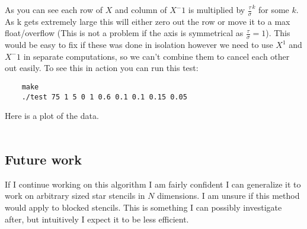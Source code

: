 \documentclass{article}
\begin{document}
As you can see each row of $X$ and column of $X^-1$ is multiplied by $\frac{\tau}{\sigma}^k$ for some $k$. 
As k gets extremely large this will either zero out the row or move it to a max float/overflow (This is not a problem if the axis is symmetrical as $\frac{\tau}{\sigma} = 1$).
This would be easy to fix if these was done in isolation however we need to use $X^1$ and $X^-1$ in separate computations, so we can't combine them to cancel each other out easily. 
To see this in action you can run this test: 
\begin{lstlisting}
	make
	./test 75 1 5 0 1 0.6 0.1 0.1 0.15 0.05
\end{lstlisting}
Here is a plot of the data. \\ \\
\subsection*{Future work}
If I continue working on this algorithm I am fairly confident I can generalize it to work on arbitrary sized star stencils in $N$ dimensions. 
I am unsure if this method would apply to blocked stencils. This is something I can possibly investigate after, but intuitively I expect it to be less efficient. 

 
\end{document}
